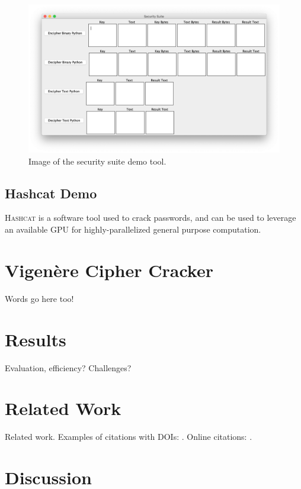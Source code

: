 \documentclass[acmlarge]{acmart}
\begin{document}
\begin{figure}
  \includegraphics[scale=0.50]{demo}
  \caption{Image of the security suite demo tool.}
  \label{fig:one}
\end{figure}

\subsection{Hashcat Demo}\label{sec:hashcat}

\textsc{Hashcat} is a software tool used to crack passwords, and can be used to leverage an available GPU for highly-parallelized general purpose computation. 

\section{Vigenère Cipher Cracker}\label{sec:vinegar}

Words go here too!

\section{Results}\label{sec:results}

Evaluation, efficiency? Challenges?

\section{Related Work}\label{sec:relatedwork}

Related work. Examples of citations with DOIs: \cite{2004:ITE:1009386.1010128, Kirschmer:2010:AEI:1958016.1958018}. Online citations: \cite{TUGInstmem, Thornburg01, CTANacmart}.

\section{Discussion}\label{sec:discussion}
\end{document}
